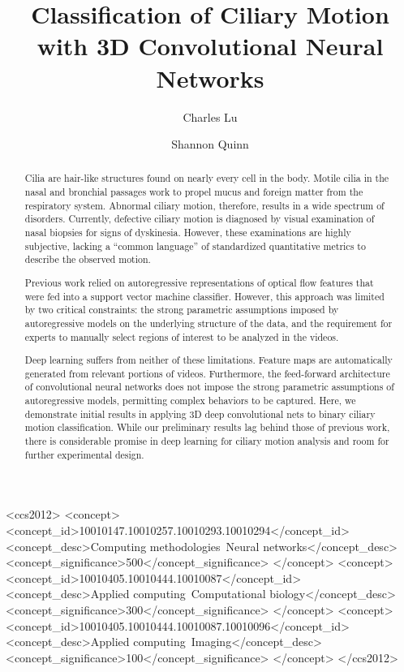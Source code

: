 \documentclass[sigconf]{acmart}
\begin{document}
\title{Classification of Ciliary Motion with 3D Convolutional Neural Networks}
\subtitle{}

\author{Charles Lu}


\author{Shannon Quinn}


\begin{abstract}
Cilia are hair-like structures found on nearly every cell in the body. Motile cilia in the nasal and bronchial passages work to propel mucus and foreign matter from the respiratory system. Abnormal ciliary motion, therefore, results in a wide spectrum of disorders. Currently, defective ciliary motion is diagnosed by visual examination of nasal biopsies for signs of dyskinesia. However, these examinations are highly subjective, lacking a ``common language'' of standardized quantitative metrics to describe the observed motion.

Previous work relied on autoregressive representations of optical flow features that were fed into a support vector machine classifier. However, this approach was limited by two critical constraints: the strong parametric assumptions imposed by autoregressive models on the underlying structure of the data, and the requirement for experts to manually select regions of interest to be analyzed in the videos.

Deep learning suffers from neither of these limitations. Feature maps are automatically generated from relevant portions of videos. Furthermore, the feed-forward architecture of convolutional neural networks does not impose the strong parametric assumptions of autoregressive models, permitting complex behaviors to be captured. Here, we demonstrate initial results in applying 3D deep convolutional nets to binary ciliary motion classification. While our preliminary results lag behind those of previous work, there is considerable promise in deep learning for ciliary motion analysis and room for further experimental design.

\end{abstract}

%
%
\begin{CCSXML}
<ccs2012>
<concept>
<concept_id>10010147.10010257.10010293.10010294</concept_id>
<concept_desc>Computing methodologies~Neural networks</concept_desc>
<concept_significance>500</concept_significance>
</concept>
<concept>
<concept_id>10010405.10010444.10010087</concept_id>
<concept_desc>Applied computing~Computational biology</concept_desc>
<concept_significance>300</concept_significance>
</concept>
<concept>
<concept_id>10010405.10010444.10010087.10010096</concept_id>
<concept_desc>Applied computing~Imaging</concept_desc>
<concept_significance>100</concept_significance>
</concept>
</ccs2012>
\end{CCSXML}
\end{document}
